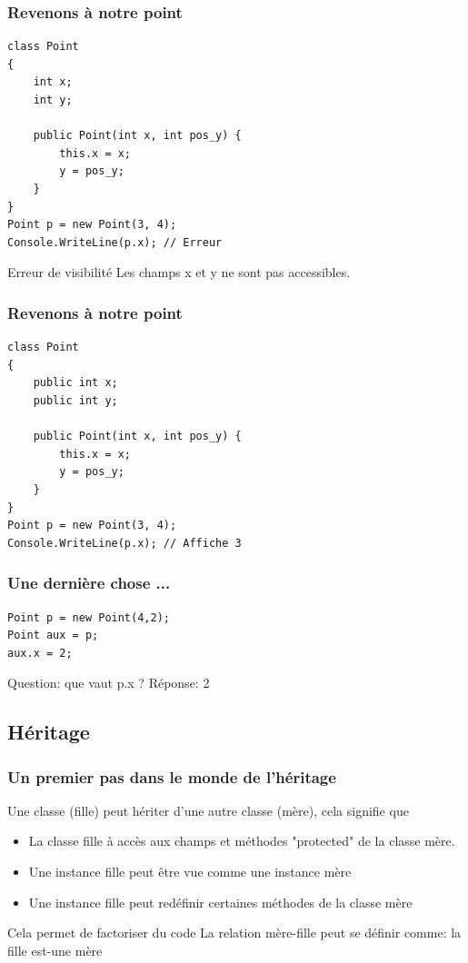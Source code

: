 \documentclass{beamer}
\begin{document}
\begin{frame}[fragile]
\frametitle{Revenons à notre point}
\begin{lstlisting}
class Point
{
    int x;
    int y;

    public Point(int x, int pos_y) {
        this.x = x;
        y = pos_y;
    }
}
Point p = new Point(3, 4);
Console.WriteLine(p.x); // Erreur
\end{lstlisting}
\begin{alertblock}{Erreur de visibilité}
Les champs x et y ne sont pas accessibles.
\end{alertblock}
\end{frame}

\begin{frame}[fragile]
\frametitle{Revenons à notre point}
\begin{lstlisting}
class Point
{
    public int x;
    public int y;
    
    public Point(int x, int pos_y) {
        this.x = x;
        y = pos_y;
    }
}
Point p = new Point(3, 4);
Console.WriteLine(p.x); // Affiche 3
\end{lstlisting}
\end{frame}

\begin{frame}[fragile]
\frametitle{Une dernière chose ...}
\begin{lstlisting}
Point p = new Point(4,2);
Point aux = p;
aux.x = 2;
\end{lstlisting}
Question: que vaut p.x ? 
\pause
Réponse: 2
\end{frame}

\subsection{Héritage}
\begin{frame}
\frametitle{Un premier pas dans le monde de l'héritage}
Une classe (fille) peut hériter d'une autre classe (mère), cela signifie que
\begin{itemize}
\item La classe fille à accès aux champs et méthodes "protected" de la classe mère.
\item Une instance fille peut être vue comme une instance mère
\item Une instance fille peut redéfinir certaines méthodes de la classe mère
\end{itemize}
\pause
Cela permet de factoriser du code
\pause
La relation mère-fille peut se définir comme: la fille est-une mère
\end{frame}
\end{document}
